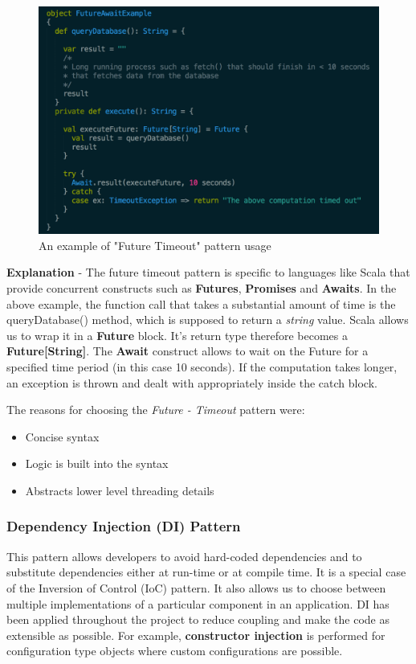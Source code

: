 \begin{figure}[H]
  \centering
    \includegraphics[width=500px]{figures/future_timeout.png}
  \caption{An example of "Future Timeout" pattern usage}
\end{figure}

\noindent
\textbf{Explanation} - The future timeout pattern is specific to languages like Scala that provide concurrent constructs such as \textbf{Futures}, \textbf{Promises} and \textbf{Awaits}. In the above example, the function call that takes a substantial amount of time is the queryDatabase() method, which is supposed to return a \textit{string} value. Scala allows us to wrap it in a \textbf{Future} block. It's return type therefore becomes a \textbf{Future[String]}. The \textbf{Await} construct allows to wait on the Future for a specified time period (in this case 10 seconds). If the computation takes longer, an exception is thrown and dealt with appropriately inside the catch block.

\noindent
The reasons for choosing the \textit{Future - Timeout} pattern were:
\begin{itemize}
\item Concise syntax
\item Logic is built into the syntax
\item Abstracts lower level threading details
\end{itemize}
\subsubsection{Dependency Injection (DI) Pattern}

This pattern allows developers to avoid hard-coded dependencies and to substitute dependencies either at run-time or at compile time. It is a special case of the Inversion of Control (IoC) pattern. It also allows us to choose between multiple implementations of a particular component in an application\cite{gof}. DI has been applied throughout the project to reduce coupling and make the code as extensible as possible. For example, \textbf{constructor injection} is performed for configuration type objects where custom configurations are possible.

